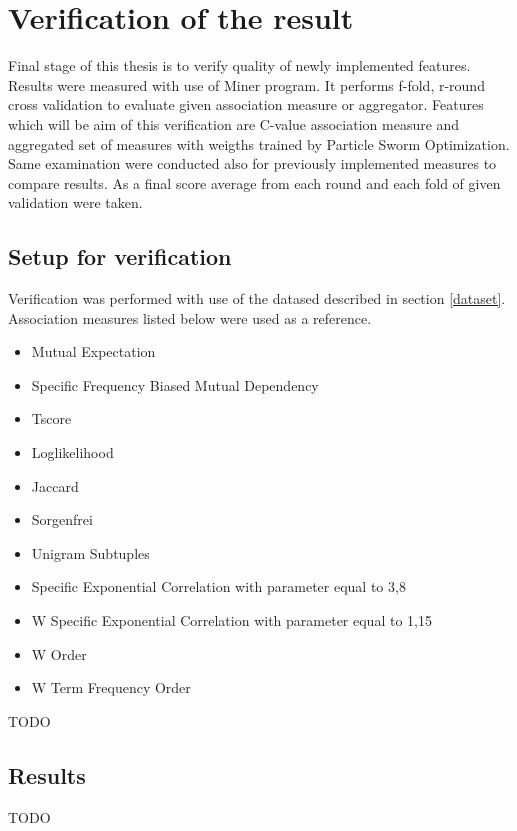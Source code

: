 \chapter{Verification of the result} \label{verification}

Final stage of this thesis is to verify quality of newly implemented features. Results were measured with use of Miner program. 
It performs f-fold, r-round cross validation to evaluate given association measure or aggregator. Features which will be aim of 
this verification are C-value association measure and aggregated set of measures with weigths trained by Particle Sworm Optimization. 
Same examination were conducted also for previously implemented measures to compare results. As a final score average from each round 
and each fold of given validation were taken.

\section{Setup for verification}
Verification was performed with use of the datased described in section \ref{dataset}. Association measures listed below 
were used as a reference.
\begin{itemize}
    \setlength\itemsep{0em}
    \item Mutual Expectation
    \item Specific Frequency Biased Mutual Dependency
    \item Tscore
    \item Loglikelihood
    \item Jaccard
    \item Sorgenfrei
    \item Unigram Subtuples
    \item Specific Exponential Correlation with parameter equal to 3,8
    \item W Specific Exponential Correlation with parameter equal to 1,15
    \item W Order
    \item W Term Frequency Order
\end{itemize}

TODO


\section{Results}

TODO